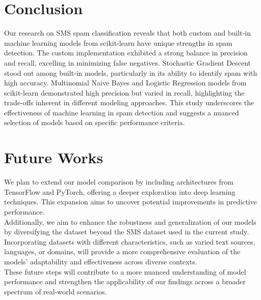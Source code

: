 \documentclass[12pt]{article}
\begin{document}

\section{Conclusion}
Our research on SMS spam classification reveals that both custom and built-in machine learning models from scikit-learn have unique strengths in spam detection. The custom implementation exhibited a strong balance in precision and recall, excelling in minimizing false negatives. Stochastic Gradient Descent stood out among built-in models, particularly in its ability to identify spam with high accuracy. Multinomial Naive Bayes and Logistic Regression models from scikit-learn demonstrated high precision but varied in recall, highlighting the trade-offs inherent in different modeling approaches. This study underscores the effectiveness of machine learning in spam detection and suggests a nuanced selection of models based on specific performance criteria.


\section{Future Works}
We plan to extend our model comparison by including architectures from TensorFlow\cite{abadi2016tensorflow} and PyTorch\cite{NEURIPS2019_9015}, offering a deeper exploration into deep learning techniques. This expansion aims to uncover potential improvements in predictive performance. \\

Additionally, we aim to enhance the robustness and generalization of our models by diversifying the dataset beyond the SMS dataset used in the current study. Incorporating datasets with different characteristics, such as varied text sources, languages, or domains, will provide a more comprehensive evaluation of the models' adaptability and effectiveness across diverse contexts. \\

These future steps will contribute to a more nuanced understanding of model performance and strengthen the applicability of our findings across a broader spectrum of real-world scenarios.

\pagebreak




\end{document}
